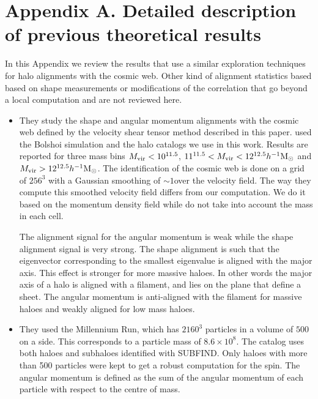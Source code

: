 \documentclass[useAMS,usenatbib]{mn2e}
\newcommand{\hMpc}{{\ifmmode{h^{-1}{\rm Mpc}}\else{$h^{-1}$Mpc }\fi}}
\newcommand{\hMsun}{{\ifmmode{h^{-1}{\rm
        {M_{\odot}}}}\else{$h^{-1}{\rm{M_{\odot}}}$~}\fi}}
\begin{document}
\section*{Appendix A. Detailed description of previous theoretical results}

In this Appendix we review the results that use a similar exploration
techniques for halo alignments with the cosmic web. Other kind of
alignment statistics based based on shape measurements
\citep{Basilakos2006} or modifications of the correlation
\citep[e.g.][]{Paz2008,Faltenbacher2009} that go beyond a local
computation and are not reviewed here. 

\begin{itemize}


\item
\cite{Libeskind2013}

They study the shape and angular momentum alignments with the cosmic
web defined by the velocity shear tensor method described in this
paper.  \cite{Libeskind2013} used the Bolshoi simulation and the halo
catalogs we use in this work. Results are reported for three mass bins $M_{\rm
 vir}<10^{11.5}$\hMsun, $11^{11.5}<M_{\rm vir}<12^{12.5}\hMsun$ and
$M_{\rm  vir}>12^{12.5}\hMsun$. The identification of the cosmic web
is done on a grid of $256^3$ with a Gaussian smoothing of $\sim
1$\hMpc over the velocity field. The way they compute this smoothed
velocity field differs from our computation. We do it based on the
momentum density field while \cite{Libesking2013} do not take into
account the mass in each cell.


The alignment signal for the angular momentum is weak while the shape
alignment signal is very strong. The shape alignment is such that the
eigenvector corresponding to the smallest eigenvalue is aligned with
the major axis. This effect is stronger for more massive haloes.  In
other words the major axis of a halo is aligned with a filament, and
lies on the plane that define a sheet. The angular momentum is
anti-aligned with the filament for massive haloes and weakly aligned
for low mass haloes. 

\item
\cite{Trowland2013}

They used the Millennium Run, which has $2160^3$ particles in a volume
of $500$\hMpc on a side. This corresponds to a particle mass of
$8.6\times 10^{8}$\hMsun. The catalog uses both haloes and subhaloes
identified with SUBFIND. Only haloes with more than 500 particles were
kept to get a robust computation for the spin. The angular momentum is
defined as the sum of the angular momentum of each particle with
respect to the centre of mass. 



\end{itemize}
\end{document}
